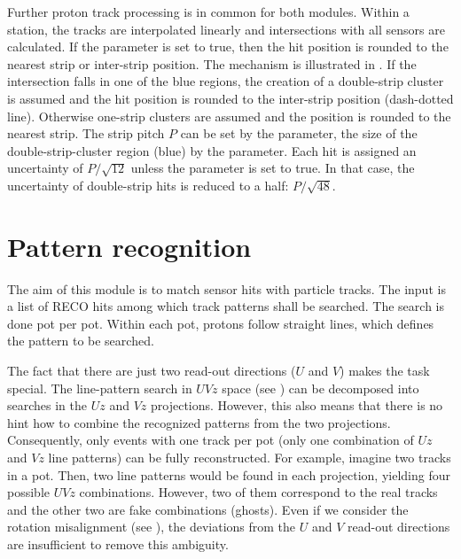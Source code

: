 Further proton track processing is in common for both modules. Within a station, the tracks are interpolated linearly and intersections with all sensors are calculated. If the  parameter is set to true, then the hit position is rounded to the nearest strip or inter-strip position. The mechanism is illustrated in . If the intersection falls in one of the blue regions, the creation of a double-strip cluster is assumed and the hit position is rounded to the inter-strip position (dash-dotted line). Otherwise one-strip clusters are assumed and the position is rounded to the nearest strip. The strip pitch $P$ can be set by the  parameter, the size of the double-strip-cluster region (blue) by the  parameter. Each hit is assigned an uncertainty of $P/\sqrt{12}$ unless the  parameter is set to true. In that case, the uncertainty of double-strip hits is reduced to a half: $P/\sqrt{48}$.



\section[pattern reco]{Pattern recognition}

The aim of this module is to match sensor hits with particle tracks. The input is a list of RECO hits among which track patterns shall be searched. The search is done pot per pot. Within each pot, protons follow straight lines, which defines the pattern to be searched.

The fact that there are just two read-out directions ($U$ and $V$) makes the task special. The line-pattern search in $UVz$ space (see ) can be decomposed into searches in the $Uz$ and $Vz$ projections. However, this also means that there is no hint how to combine the recognized patterns from the two projections. Consequently, only events with one track per pot (only one combination of $Uz$ and $Vz$ line patterns) can be fully reconstructed. For example, imagine two tracks in a pot. Then, two line patterns would be found in each projection, yielding four possible $UVz$ combinations. However, two of them correspond to the real tracks and the other two are fake combinations (ghosts). Even if we consider the rotation misalignment (see ), the deviations from the $U$ and $V$ read-out directions are insufficient to remove this ambiguity. 

